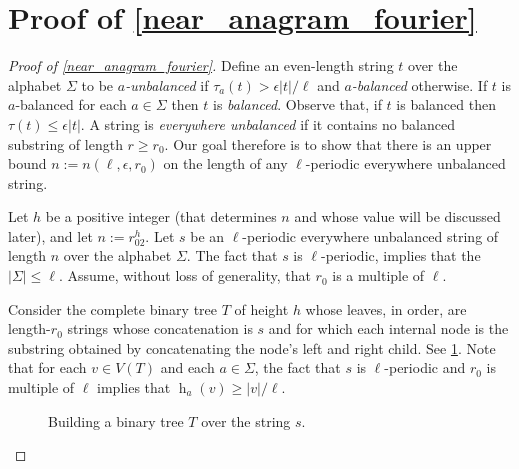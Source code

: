 \documentclass{patmorin}
\DeclareMathOperator{\hist}{h}
\begin{document}
\section{Proof of \cref{near_anagram_fourier}}
\label{near_anagram_proof}



\begin{proof}[Proof of \cref{near_anagram_fourier}]
    Define an even-length string $t$ over the alphabet $\Sigma$ to be \emph{$a$-unbalanced} if $\tau_a(t)>\epsilon|t|/\ell$ and \emph{$a$-balanced} otherwise.  If $t$ is $a$-balanced for each $a\in\Sigma$ then $t$ is \emph{balanced}. Observe that, if $t$ is balanced then $\tau(t)\le \epsilon|t|$. A string is \emph{everywhere unbalanced} if it contains no balanced substring of length $r\ge r_0$. Our goal therefore is to show that there is an upper bound $n:=n(\ell,\epsilon,r_0)$ on the length of any $\ell$-periodic everywhere unbalanced string.

    Let $h$ be a positive integer (that determines $n$ and whose value will be discussed later), and let $n:=r_02^{h}$. Let $s$ be an $\ell$-periodic everywhere unbalanced string of length $n$ over the alphabet $\Sigma$.  The fact that $s$ is $\ell$-periodic, implies that the $|\Sigma|\le\ell$.  Assume, without loss of generality, that $r_0$ is a multiple of $\ell$.

    Consider the complete binary tree $T$ of height $h$ whose leaves, in order, are length-$r_0$ strings whose concatenation is $s$ and for which each internal node is the substring obtained by concatenating the node's left and right child.  See \cref{binary_tree}.  Note that for each $v\in V(T)$ and each $a\in\Sigma$, the fact that $s$ is $\ell$-periodic and $r_0$ is multiple of $\ell$ implies that $\hist_a(v)\ge |v|/\ell$.

    \begin{figure}
        \caption{Building a binary tree $T$ over the string $s$.}
        \label{binary_tree}
    \end{figure}



\end{proof}
\end{document}
